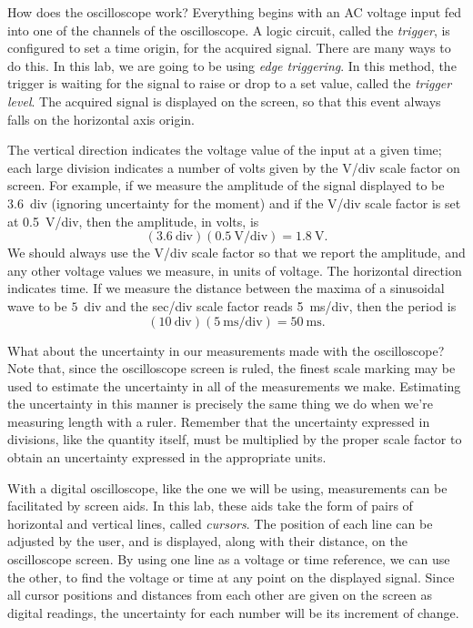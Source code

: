 How does the oscilloscope work? Everything begins with an AC voltage input
fed into one of the channels of the oscilloscope.  A logic circuit, called the
{\it trigger}, is configured to set a time origin, for the acquired signal.
There are many ways to do this. In this lab, we are going to be using {\it
edge triggering}. In this method, the trigger is waiting for the signal to
raise or drop to a set value, called the {\it trigger level}. The acquired
signal is displayed on the screen, so that this event always falls on the
horizontal axis origin.

The vertical direction indicates the voltage value of the input at a given 
time; each large division indicates a number of volts given by the V/div
scale factor on screen.  For example, if we measure the amplitude of 
the signal displayed to be 3.6~div (ignoring uncertainty for the moment)
and if the V/div scale factor is set at 0.5~V/div, then the amplitude,
in volts, is 
$$ (3.6~\mbox{div}) (0.5~\mbox{V/div}) = 1.8~\mbox{V}. $$
We should always use the V/div scale factor so that we report the 
amplitude, and any other voltage values we measure, in units of voltage.
The horizontal direction indicates time. If we measure the distance between 
the maxima of a sinusoidal wave to be $5$~div and the sec/div scale factor
reads 5~ms/div, then the period is 
$$(10~\mbox{div}) (5~\mbox{ms/div}) = 50~\mbox{ms}.$$

What about the uncertainty in our measurements made with the oscilloscope? 
Note that, since the oscilloscope screen is ruled, the finest scale marking 
may be used to estimate the uncertainty in all of the measurements we make.  
Estimating the uncertainty in this manner is precisely the same thing we do
when we're measuring length with a ruler. Remember that the uncertainty 
expressed in divisions, like the quantity itself, must be multiplied by the 
proper scale factor to obtain an uncertainty expressed in the appropriate 
units.

With a digital oscilloscope, like the one we will be using, measurements can
be facilitated by screen aids. In this lab, these aids take the form of pairs
of horizontal and vertical lines, called {\it cursors}. The position of each
line can be adjusted by the user, and is displayed, along with their distance,
on the oscilloscope screen. By using one line as a voltage or time reference,
we can use the other, to find the voltage or time at any point on the
displayed signal. Since all cursor positions and distances from each other are
given on the screen as digital readings, the uncertainty for each number will
be its increment of change.

